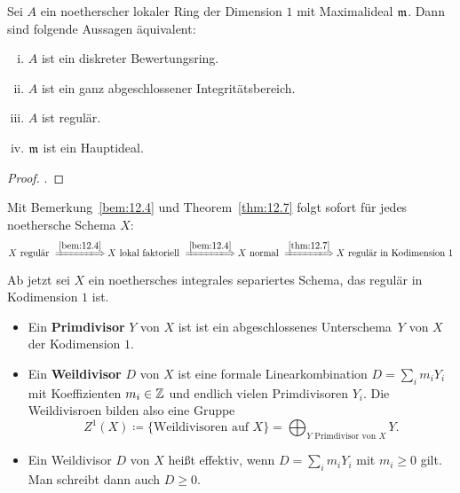 \begin{thm}
\label{thm:12.7}
	Sei $A$ ein noetherscher lokaler Ring der Dimension $1$ mit Maximalideal $\mathfrak{m}$. Dann sind folgende Aussagen äquivalent:
	\begin{enumerate}[i)]
		\item $A$ ist ein diskreter Bewertungsring.
		\item $A$ ist ein ganz abgeschlossener Integritätsbereich.
		\item $A$ ist regulär.
		\item $\mathfrak{m}$ ist ein Hauptideal.
	\end{enumerate}
	\begin{proof}
		\cite[Proposition~9.2, S.~94]{atiyah1994introduction}.
	\end{proof}
\end{thm}

\begin{bem}
\label{bem:12.8}
	Mit Bemerkung~\ref{bem:12.4} und Theorem~\ref{thm:12.7} folgt sofort für jedes noethersche Schema $X$:
	\[
		X \text{ regulär } \xLongrightarrow{\ref{bem:12.4}} X \text{ lokal faktoriell } \xLongrightarrow{\ref{bem:12.4}} X \text{ normal } \xLongrightarrow{\ref{thm:12.7}} X \text{ regulär in Kodimension } 1
	\]
\end{bem}

Ab jetzt sei $X$ ein noethersches integrales separiertes Schema, das regulär in Kodimension $1$ ist.

\begin{defn}
\label{defn:12.9}
	\begin{itemize}
		\item Ein \textbf{Primdivisor} $Y$ von $X$ ist ist ein abgeschlossenes Unterschema~$Y$ von $X$ der Kodimension $1$.
		\item Ein \textbf{Weildivisor} $D$ von $X$ ist eine formale Linearkombination $D=\sum_{i}m_iY_i$ mit Koeffizienten $m_i\in \mathbb {Z}$ und endlich vielen Primdivisoren $Y_i$. Die Weildivisroen bilden also eine Gruppe
		\[
			Z^1(X) \coloneqq \{\text{Weildivisoren auf }X\} = \bigoplus_{Y \text{ Primdivisor von }X}Y.
		\]
		\item Ein Weildivisor $D$ von $X$ heißt effektiv, wenn $D = \sum_{i}m_iY_i$ mit $m_i\ge 0$ gilt. Man schreibt dann auch $D \ge 0$.
	\end{itemize}
\end{defn}


